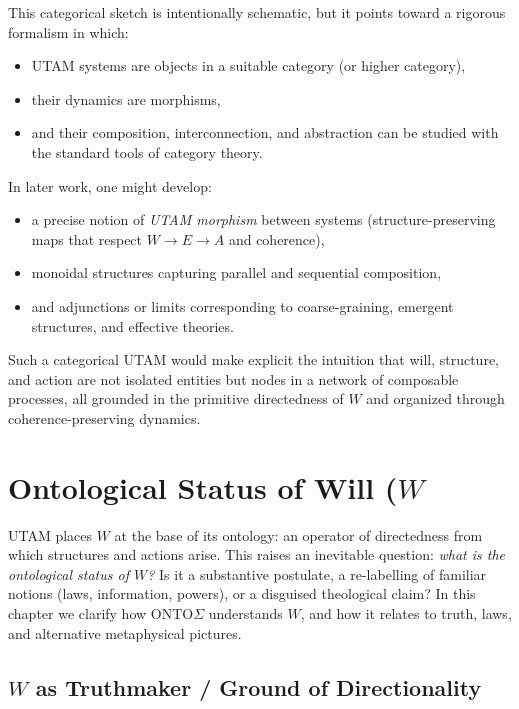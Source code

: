 \documentclass[12pt,a4paper]{report}
\newcommand{\Will}{W}
\begin{document}
This categorical sketch is intentionally schematic, but it points toward a rigorous formalism in which:

\begin{itemize}[leftmargin=2em]
    \item UTAM systems are objects in a suitable category (or higher category),
    \item their dynamics are morphisms,
    \item and their composition, interconnection, and abstraction can be studied with the standard tools of category theory.
\end{itemize}

In later work, one might develop:

\begin{itemize}[leftmargin=2em]
    \item a precise notion of \emph{UTAM morphism} between systems (structure-preserving maps that respect \(\Will \to E \to A\) and coherence),
    \item monoidal structures capturing parallel and sequential composition,
    \item and adjunctions or limits corresponding to coarse-graining, emergent structures, and effective theories.
\end{itemize}

Such a categorical UTAM would make explicit the intuition that will, structure, and action are not isolated entities but nodes in a network of composable processes, all grounded in the primitive directedness of \(\Will\) and organized through coherence-preserving dynamics.


\chapter{Ontological Status of Will (\texorpdfstring{$W$}{W}} 

UTAM places \(\Will\) at the base of its ontology: an operator of directedness from which structures and actions arise. This raises an inevitable question: \emph{what is the ontological status of \(W\)?} Is it a substantive postulate, a re-labelling of familiar notions (laws, information, powers), or a disguised theological claim? In this chapter we clarify how ONTO$\Sigma$ understands \(W\), and how it relates to truth, laws, and alternative metaphysical pictures.

\section{\texorpdfstring{$W$}{W} as Truthmaker / Ground of Directionality}
\end{document}
